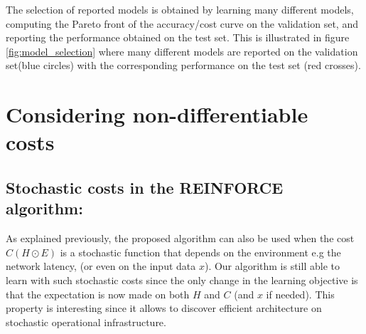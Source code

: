 \documentclass[10pt,twocolumn,letterpaper]{article}
\begin{document}
The selection of reported models is obtained by learning many different models, computing the Pareto front of the accuracy/cost curve on the validation set, and reporting the performance obtained on the test set. This is illustrated in figure \ref{fig:model_selection} where many different models are reported on the validation set(blue circles) with the corresponding performance on the test set (red crosses).

\newpage




\section*{Considering non-differentiable costs}
\subsection*{Stochastic costs in the REINFORCE algorithm: } As explained previously, the proposed algorithm can also be used when the cost $C(H \odot E)$ is a stochastic function that depends on the environment e.g the network latency, (or even on the input data $x$). Our algorithm is still able to learn with such stochastic costs since the only change in the learning objective is that the expectation is now made on both $H$ and $C$ (and $x$ if needed). 
This property is interesting since it allows to discover efficient architecture on stochastic operational infrastructure. 

\end{document}

